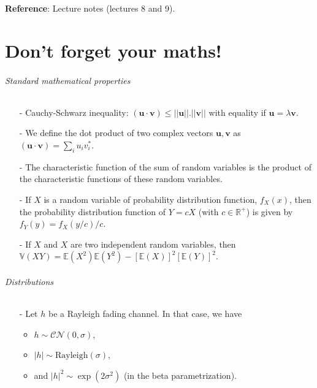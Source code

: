 \documentclass [a4paper, 11pt] {article}
\begin{document}
\begin{reminder}
    \textbf{Reference}: Lecture notes (lectures 8 and 9).

    \pagebreak
    \part*{Don't forget your maths!}

\paragraph{Standard mathematical properties}

\begin{itemize}
\item[-] Cauchy-Schwarz inequality: $(\mathbf{u} \cdot\mathbf{v}) \leq ||\mathbf{u}||.||\mathbf{v}||$ with equality if $\mathbf{u} = \lambda \mathbf{v}$.

\item[-] We define the dot product of two complex vectors $\mathbf{u},\mathbf{v}$ as $(\mathbf{u} \cdot\mathbf{v}) = \sum_i u_iv_i^*$.

\item[-] The characteristic function of the sum of random variables is the product of the characteristic functions of these random variables.

\item[-] If $X$ is a random variable of probability distribution function, $f_X(x)$, then the probability distribution function of $Y=cX$ (with $c \in \mathbb{R}^+$) is given by $f_Y(y) = f_X(y/c)/c$.

\item[-] If $X$ and $X$ are two independent random variables, then $\mathbb{V}(XY)= \mathbb{E}(X^2) \mathbb{E}(Y^2) - [\mathbb{E}(X)]^2 [\mathbb{E}(Y)]^2$.
\end{itemize}


\paragraph{Distributions}

\begin{itemize}
\item[-] Let $h$ be a Rayleigh fading channel. In that case, we have
    \begin{itemize}
        \item $h \sim \mathcal{C}\mathcal{N}(0,\sigma)$,
        \item $|h| \sim \text{Rayleigh}(\sigma)$,
        \item and $|h|^2 \sim \exp(2\sigma^2)$ (in the beta parametrization).
    \end{itemize}


\end{itemize}
\end{reminder}
\end{document}
